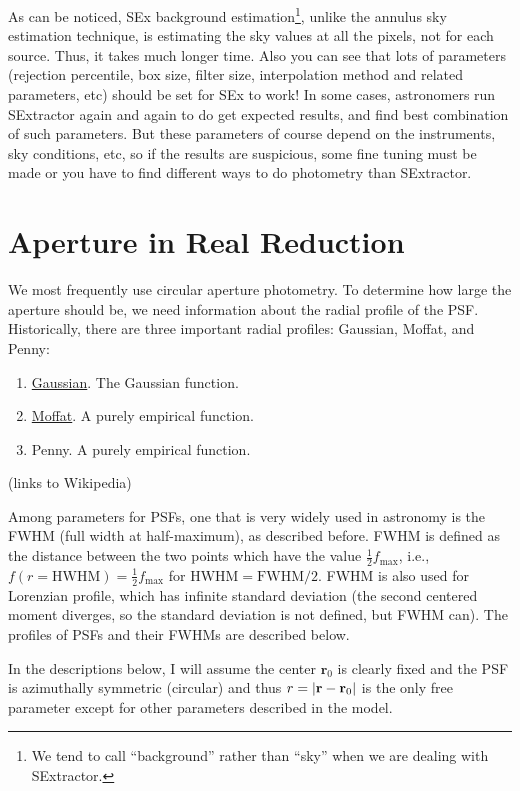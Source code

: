 As can be noticed, SEx background estimation\footnote{We tend to call ``background'' rather than ``sky'' when we are dealing with SExtractor.}, unlike the annulus sky estimation technique, is estimating the sky values at all the pixels, not for each source. Thus, it takes much longer time. Also you can see that lots of parameters (rejection percentile, box size, filter size, interpolation method and related parameters, etc) should be set for SEx to work! In some cases, astronomers run SExtractor again and again to do get expected results, and find best combination of such parameters. But these parameters of course depend on the instruments, sky conditions, etc, so if the results are suspicious, some fine tuning must be made or you have to find different ways to do photometry than SExtractor.


\section{Aperture in Real Reduction}
We most frequently use circular aperture photometry. To determine how large the aperture should be, we need information about the radial profile of the PSF. Historically, there are three important radial profiles: Gaussian, Moffat, and Penny:
\begin{enumerate}
\item \href{https://en.wikipedia.org/wiki/Gaussian_function}{Gaussian}. The Gaussian function.
\item \href{https://en.wikipedia.org/wiki/Moffat_distribution}{Moffat}. A purely empirical function. 
\item Penny. A purely empirical function.
\end{enumerate}
(links to Wikipedia)

Among parameters for PSFs, one that is very widely used in astronomy is the FWHM (full width at half-maximum), as described before. FWHM is defined as the distance between the two points which have the value $\frac{1}{2} f_\mathrm{max}$, i.e., $ f(r = \mathrm{HWHM}) = \frac{1}{2} f_\mathrm{max} $ for $ \mathrm{HWHM} = \mathrm{FWHM}/2 $. FWHM is also used for Lorenzian profile, which has infinite standard deviation (the second centered moment diverges, so the standard deviation is not defined, but FWHM can). The profiles of PSFs and their FWHMs are described below.

In the descriptions below, I will assume the center $ \textbf{r}_0 $ is clearly fixed and the PSF is azimuthally symmetric (circular) and thus $ r = \abs{\textbf{r} - \textbf{r}_0} $ is the only free parameter except for other parameters described in the model.

